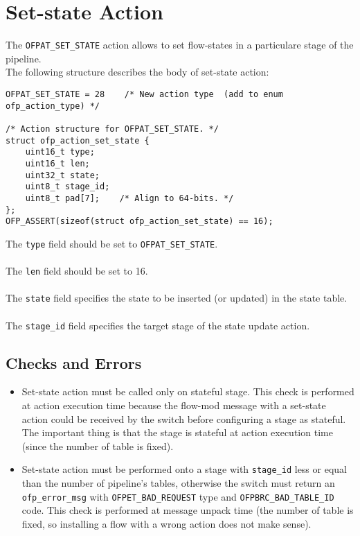 \section{Set-state Action}
\label{sec:act_set_state_proto}

The \texttt{OFPAT\_SET\_STATE} action allows to set flow-states in a particulare stage of the pipeline.\\The following structure describes the body of set-state action:

\scriptsize
\begin{verbatim}
OFPAT_SET_STATE = 28    /* New action type  (add to enum ofp_action_type) */

/* Action structure for OFPAT_SET_STATE. */
struct ofp_action_set_state {
    uint16_t type;
    uint16_t len;
    uint32_t state;
    uint8_t stage_id;
    uint8_t pad[7];    /* Align to 64-bits. */
};
OFP_ASSERT(sizeof(struct ofp_action_set_state) == 16);
\end{verbatim}
\normalsize
\noindent
The \texttt{type} field should be set to \texttt{OFPAT\_SET\_STATE}.
\\\\
The \texttt{len} field should be set to 16.
\\\\
The \texttt{state} field specifies the state to be inserted (or updated) in the state table.
\\\\
The \texttt{stage\_id} field specifies the target stage of the state update action.


\subsection{Checks and Errors}

\begin{itemize}
\item Set-state action must be called only on stateful stage. This check is performed at action execution time because the flow-mod message with a set-state action could be received by the switch before configuring a stage as stateful. The important thing is that the stage is stateful at action execution time (since the number of table is fixed).

\item Set-state action must be performed onto a stage with \texttt{stage\_id} less or equal than the number of pipeline’s tables, otherwise the switch must return an \texttt{ofp\_error\_msg} with \texttt{OFPET\_BAD\_REQUEST} type and \texttt{OFPBRC\_BAD\_TABLE\_ID} code. This check is performed at message unpack time (the number of table is fixed, so installing a flow with a wrong action does not make sense).
\end{itemize}

